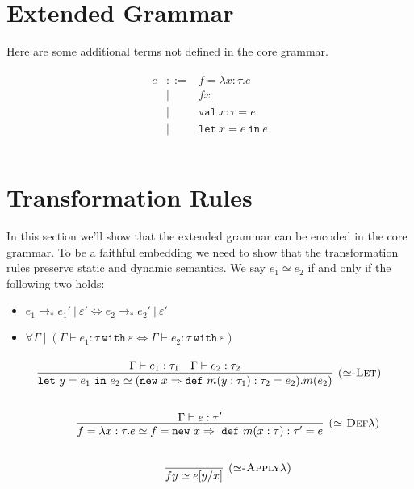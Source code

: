 \documentclass{llncs}
\newcommand{\keywadj}[1]{\mathtt{#1}}
\newcommand{\keyw}[1]{\keywadj{#1}~}
\begin{document}
\section{Extended Grammar}

Here are some additional terms not defined in the core grammar.

\[
\begin{array}{lll}
\begin{array}{lllr}

	e & ::= & f = \lambda x : \tau . e\\
  		& | & f x\\
  		& | & \keyw{val} x : \tau = e\\
  		& | & \keyw{let} x = e~\keyw{in} e\\
		&&\\
\end{array}
\end{array}
\]



\section{Transformation Rules}

In this section we'll show that the extended grammar can be encoded in the core grammar. To be a faithful embedding we need to show that the transformation rules preserve static and dynamic semantics. We say $e_1 \simeq e_2$ if and only if the following two holds:
\begin{itemize}
	\item $e_1 \longrightarrow_* e_1'~|~\varepsilon'
				\iff
				 e_2 \longrightarrow_* e_2'~|~\varepsilon'$
	\item $\forall \Gamma \mid (\Gamma \vdash e_1 : \tau~\keyw{with} \varepsilon \iff \Gamma \vdash e_2 : \tau~\keyw{with} \varepsilon)$
\end{itemize}

\paragraph{}


\[
\begin{array}{c}
	
\infer[\textsc{($\simeq$-Let)}]
	{\keyw{let} y = e_1~\keyw{in} e_2 \simeq (\keyw{new} x \Rightarrow \keyw{def} m(y: \tau_1) : \tau_2 = e_2).m(e_2)}
	{\Gamma \vdash e_1 : \tau_1 & \Gamma \vdash e_2 : \tau_2}  \\[5ex]
~~~~~~~~~~
\infer[\textsc{($\simeq$-Def$\lambda$)}]
	{f = \lambda x : \tau . e \simeq f = \keyw{new} x \Rightarrow~\keyw{def} m(x : \tau) : \tau' = e}
	{\Gamma \vdash e : \tau'}\\[5ex]
~~~~~~~~~~
\infer[\textsc{($\simeq$-Apply$\lambda$)}] 
	{f y \simeq e[y/x] }
	{} \\[5ex]
~~~~~~~~~~

  
\end{array}
\]	
\end{document}
